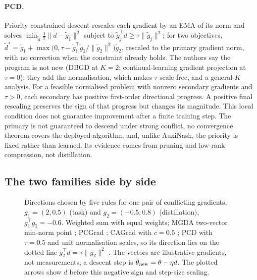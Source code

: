 \paragraph{PCD.}
Priority-constrained descent \citep{varam2026pcd} rescales each gradient by an EMA of its norm and
solves $\min_{\tilde d}\tfrac12\|\tilde d-\tilde g_1\|^2$ subject to
$\tilde g_j^\top\tilde d\ge\tau\|\tilde g_j\|^2$; for two objectives,
$\tilde d^\star=\tilde g_1+\max\big(0,\tau-\tilde g_1^\top\tilde g_2/\|\tilde g_2\|^2\big)\tilde g_2$,
rescaled to the primary gradient norm, with no correction when the constraint already holds.
The authors say the program is not new (DBGD at $K=2$; continual-learning gradient projection at $\tau=0$); they add the
normalisation, which makes $\tau$ scale-free, and a general-$K$ analysis. For a feasible normalised problem with nonzero secondary gradients and $\tau>0$, each secondary has positive first-order directional progress. A positive final rescaling preserves the sign of that progress but changes its magnitude. This local condition does not guarantee improvement after a finite training step. The primary is not guaranteed to descend under strong conflict, no convergence theorem covers the deployed algorithm, and, unlike AuxiNash, the priority is fixed
rather than learned. Its evidence comes from pruning and low-rank compression, not distillation.

\subsection{The two families side by side}

\begin{figure}[t]
\centering
\resizebox{0.75\linewidth}{!}{}
\caption{Directions chosen by five rules for one pair of conflicting gradients,
$g_1=(2,0.5)$ (task) and $g_2=(-0.5,0.8)$ (distillation), $g_1^\top g_2=-0.6$. Weighted sum with
equal weights; MGDA two-vector min-norm point \citep{sener2018mgda}; PCGrad
\citep{yu2020pcgrad}; CAGrad with $c=0.5$ \citep{liu2021cagrad}; PCD with $\tau=0.5$ and unit
normalisation scales, so its direction lies on the dotted line $g_2^\top d=\tau\|g_2\|^2$
\citep{varam2026pcd}. The vectors are illustrative gradients, not measurements; a descent step is $\theta_{\rm new}=\theta-\eta d$. The plotted arrows show $d$ before this negative sign and step-size scaling.}
\label{fig:moo_geometry}
\end{figure}

